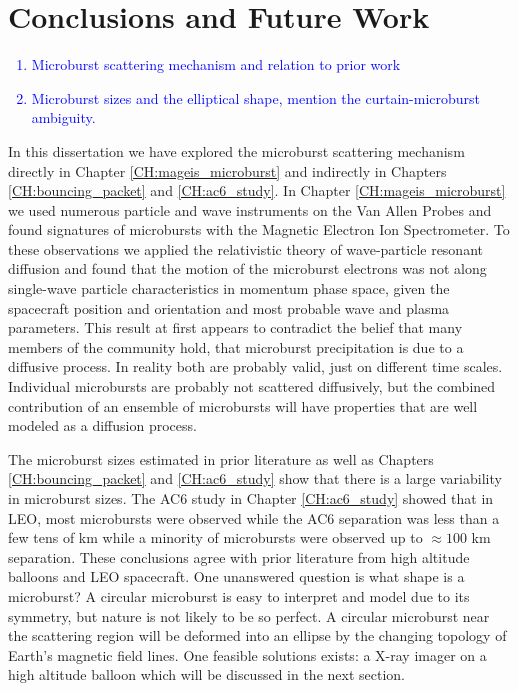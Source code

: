\chapter{Conclusions and Future Work}\label{conclusions}
\textcolor{blue}{
\begin{enumerate}
\item Microburst scattering mechanism and relation to prior work
\item Microburst sizes and the elliptical shape, mention the curtain-microburst ambiguity.
\end{enumerate}
}

In this dissertation we have explored the microburst scattering mechanism directly in Chapter \ref{CH:mageis_microburst} and indirectly in Chapters \ref{CH:bouncing_packet} and \ref{CH:ac6_study}. In Chapter \ref{CH:mageis_microburst} we used numerous particle and wave instruments on the Van Allen Probes and found signatures of microbursts with the Magnetic Electron Ion Spectrometer. To these observations we applied the relativistic theory of wave-particle resonant diffusion and found that the motion of the microburst electrons was not along single-wave particle characteristics in momentum phase space, given the spacecraft position and orientation and most probable wave and plasma parameters. This result at first appears to contradict the belief that many members of the community hold, that microburst precipitation is due to a diffusive process. In reality both are probably valid, just on different time scales. Individual microbursts are probably not scattered diffusively, but the combined contribution of an ensemble of microbursts will have properties that are well modeled as a diffusion process.

The microburst sizes estimated in prior literature as well as Chapters \ref{CH:bouncing_packet} and \ref{CH:ac6_study} show that there is a large variability in microburst sizes. The AC6 study in Chapter \ref{CH:ac6_study} showed that in LEO, most microbursts were observed while the AC6 separation was less than a few tens of km while a minority of microbursts were observed up to $\approx 100$ km separation. These conclusions agree with prior literature from high altitude balloons and LEO spacecraft. One unanswered question is what shape is a microburst? A circular microburst is easy to interpret and model due to its symmetry, but nature is not likely to be so perfect. A circular microburst near the scattering region will be deformed into an ellipse by the changing topology of Earth's magnetic field lines. One feasible solutions exists: a X-ray imager on a high altitude balloon which will be discussed in the next section.

